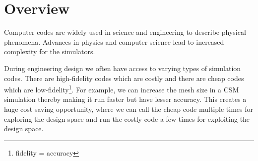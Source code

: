 \section*{\hfil  Overview \hfil }

Computer codes are widely used in science and engineering to describe physical phenomena.
Advances in physics and computer science lead to increased complexity for the simulators.

During engineering design we often have access to varying types of simulation codes. There are high-fidelity codes which are costly and there are cheap codes which are low-fidelity\footnote{fidelity = accuracy}. For example, we can increase the mesh size in a CSM simulation thereby making it run faster but have lesser accuracy. This creates a huge cost saving opportunity, where we can call the cheap code multiple times for exploring the design space and run the costly code a few times for exploiting the design space. 

